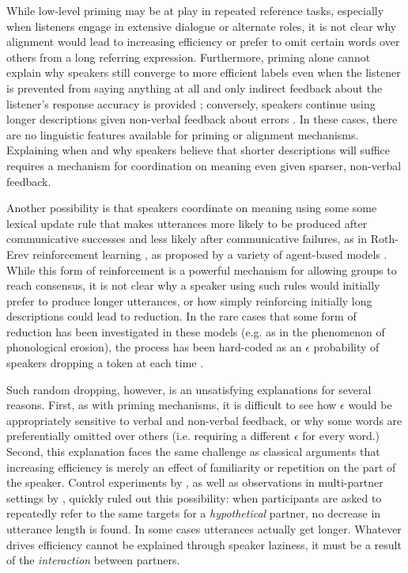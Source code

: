 While low-level priming may be at play in repeated reference tasks, especially when listeners engage in extensive dialogue or alternate roles, it is not clear why alignment would lead to increasing efficiency or prefer to omit certain words over others from a long referring expression.
Furthermore, priming alone cannot explain why speakers still converge to more efficient labels even when the listener is prevented from saying anything at all and only indirect feedback about the listener's response accuracy is provided \cite{KraussWeinheimer66_Tangrams}; conversely, speakers continue using longer descriptions given non-verbal feedback about errors \cite{hawkins2020characterizing}.
In these cases, there are no linguistic features available for priming or alignment mechanisms.
Explaining when and why speakers believe that shorter descriptions will suffice requires a mechanism for coordination on meaning even given sparser, non-verbal feedback.

Another possibility is that speakers coordinate on meaning using some some lexical update rule that makes utterances more likely to be produced after communicative successes and less likely after communicative failures, as in Roth-Erev reinforcement learning \cite{erev1998predicting}, as proposed by a variety of agent-based models \cite{steels_self-organizing_1995,barr_establishing_2004,young_evolution_2015} .
While this form of reinforcement is a powerful mechanism for allowing groups to reach consensus, it is not clear why a speaker using such rules would initially prefer to produce longer utterances, or how simply reinforcing initially long descriptions could lead to reduction. 
In the rare cases that some form of reduction has been investigated in these models (e.g. as in the phenomenon of phonological erosion), the process has been hard-coded as an $\epsilon$ probability of speakers dropping a token at each time \cite{beuls2013agent,steels2016agent}.

Such random dropping, however, is an unsatisfying explanations for several reasons.
First, as with priming mechanisms, it is difficult to see how $\epsilon$ would be appropriately sensitive to verbal and non-verbal feedback, or why some words are preferentially omitted over others (i.e. requiring a different $\epsilon$ for every word.)
Second, this explanation faces the same challenge as classical arguments that increasing efficiency is merely an effect of familiarity or repetition on the part of the speaker.
Control experiments by , as well as observations in multi-partner settings by , quickly ruled out this possibility: when participants are asked to repeatedly refer to the same targets for a \emph{hypothetical} partner, no decrease in utterance length is found. 
In some cases utterances actually get longer.
Whatever drives efficiency cannot be explained through speaker laziness, it must be a result of the \emph{interaction} between partners.

